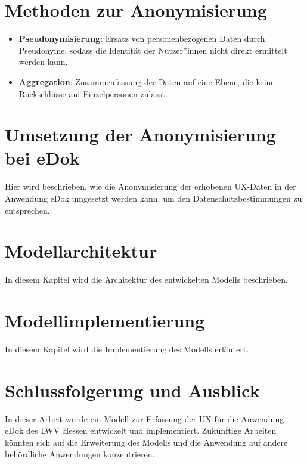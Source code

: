 \documentclass[12pt,oneside]{article}
\begin{document}
\section{Methoden zur Anonymisierung}
\begin{itemize}
\item \textbf{Pseudonymisierung}: Ersatz von personenbezogenen Daten durch Pseudonyme, sodass die Identität der Nutzer*innen nicht direkt ermittelt werden kann.
\item \textbf{Aggregation}: Zusammenfassung der Daten auf eine Ebene, die keine Rückschlüsse auf Einzelpersonen zulässt.
\end{itemize}
\section{Umsetzung der Anonymisierung bei eDok}
Hier wird beschrieben, wie die Anonymisierung der erhobenen UX-Daten in der Anwendung eDok umgesetzt werden kann, um den Datenschutzbestimmungen zu entsprechen.
\section{Modellarchitektur}
In diesem Kapitel wird die Architektur des entwickelten Modells beschrieben.
\section{Modellimplementierung}
In diesem Kapitel wird die Implementierung des Modells erläutert.
\section{Schlussfolgerung und Ausblick}
In dieser Arbeit wurde ein Modell zur Erfassung der UX für die Anwendung eDok des LWV Hessen entwickelt und implementiert. Zukünftige Arbeiten könnten sich auf die Erweiterung des Modells und die Anwendung auf andere behördliche Anwendungen konzentrieren.
\end{document}

